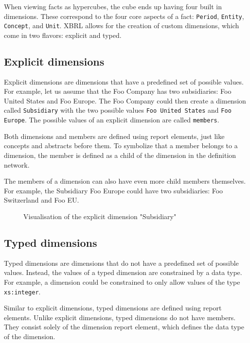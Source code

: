 When viewing facts as hypercubes, the cube ends up having four built in dimensions.
These correspond to the four core aspects of a fact: \texttt{Period}, \texttt{Entity}, \texttt{Concept}, and \texttt{Unit}.
XBRL allows for the creation of custom dimensions, which come in two flavors: explicit and typed.

\subsection{Explicit dimensions}

Explicit dimensions are dimensions that have a predefined set of possible values.
For example, let us assume that the Foo Company has two subsidiaries: Foo United States and Foo Europe.
The Foo Company could then create a dimension called \texttt{Subsidiary} with the two possible values \texttt{Foo United States} and \texttt{Foo Europe}.
The possible values of an explicit dimension are called \texttt{members}.

Both dimensions and members are defined using report elements, just like concepts and abstracts before them.
To symbolize that a member belongs to a dimension, the member is defined as a child of the dimension in the definition network.

The members of a dimension can also have even more child members themselves.
For example, the Subsidiary Foo Europe could have two subsidiaries: Foo Switzerland and Foo EU.

\begin{figure}[H]
    \label{fig:example_explicit_dimension}
    \caption{Visualisation of the explicit dimension "Subsidiary"}
\end{figure}

\subsection{Typed dimensions}

Typed dimensions are dimensions that do not have a predefined set of possible values.
Instead, the values of a typed dimension are constrained by a data type.
For example, a dimension could be constrained to only allow values of the type \texttt{xs:integer}.

Similar to explicit dimensions, typed dimensions are defined using report elements.
Unlike explicit dimensions, typed dimensions do not have members.
They consist solely of the dimension report element, which defines the data type of the dimension.

